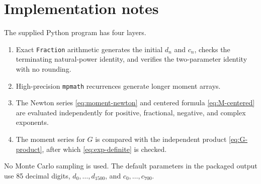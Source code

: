 \documentclass[11pt,oneside]{article}
\theoremstyle{definition}
\theoremstyle{remark}
\newcommand{\1}{\mathbf 1}
\begin{document}
\section{Implementation notes}

The supplied Python program has four layers.
\begin{enumerate}
\item Exact \texttt{Fraction} arithmetic generates the initial \(d_n\) and
      \(c_n\), checks the terminating natural-power identity, and verifies the
      two-parameter identity with no rounding.
\item High-precision \texttt{mpmath} recurrences generate longer moment arrays.
\item The Newton series \eqref{eq:moment-newton} and centered formula
      \eqref{eq:M-centered} are evaluated independently for positive,
      fractional, negative, and complex exponents.
\item The moment series for \(G\) is compared with the independent product
      \eqref{eq:G-product}, after which \eqref{eq:exp-definite} is checked.
\end{enumerate}
No Monte Carlo sampling is used.  The default parameters in the packaged
output use 85 decimal digits, \(d_0,\ldots,d_{1500}\), and
\(c_0,\ldots,c_{700}\).
\end{document}
